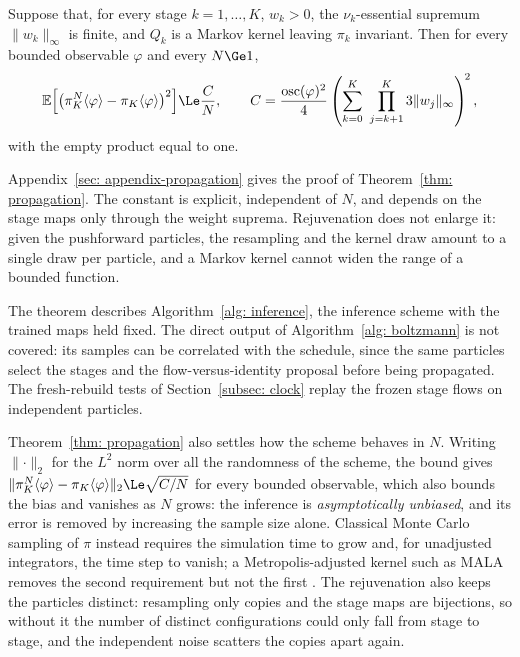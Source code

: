 \documentclass{article}
\begin{document}
\begin{theorem}
\label{thm: propagation}
Suppose that, for every stage $k=1,\dots,K$, $w_k>0$, the $\nu_k$-essential supremum $\lVert w_k \rVert_\infty$ is finite, and $Q_k$ is a Markov kernel leaving $\pi_k$ invariant. Then for every bounded observable $\varphi$ and every $N \Ge 1$,
\begin{equation}
    \mathbb E\Bigl[\bigl(\pi_K^N\langle \varphi\rangle - \pi_K\langle \varphi\rangle\bigr)^{2}\Bigr]
    \Le \frac{C}{N},
    \qquad
    C = \frac{\operatorname{osc}(\varphi)^{2}}{4}
    \left(\sum_{k=0}^{K}\ \prod_{j=k+1}^{K} 3\lVert w_j \rVert_\infty\right)^{\!2},
    \label{eq: propagation-bound}
\end{equation}
with the empty product equal to one.
\end{theorem}
\noindent
Appendix~\ref{sec: appendix-propagation} gives the proof of Theorem~\ref{thm: propagation}. The constant is explicit, independent of $N$, and depends on the stage maps only through the weight suprema. Rejuvenation does not enlarge it: given the pushforward particles, the resampling and the kernel draw amount to a single draw per particle, and a Markov kernel cannot widen the range of a bounded function.

\begin{remark}
The theorem describes Algorithm~\ref{alg: inference}, the inference scheme with the trained maps held fixed. The direct output of Algorithm~\ref{alg: boltzmann} is not covered: its samples can be correlated with the schedule, since the same particles select the stages and the flow-versus-identity proposal before being propagated. The fresh-rebuild tests of Section~\ref{subsec: clock} replay the frozen stage flows on independent particles.
\end{remark}

Theorem~\ref{thm: propagation} also settles how the scheme behaves in $N$. Writing $\lVert\cdot\rVert_2$ for the $L^2$ norm over all the randomness of the scheme, the bound gives $\lVert \pi_K^N\langle \varphi\rangle - \pi_K\langle \varphi\rangle \rVert_2 \Le \sqrt{C/N}$ for every bounded observable, which also bounds the bias and vanishes as $N$ grows: the inference is \emph{asymptotically unbiased}, and its error is removed by increasing the sample size alone. Classical Monte Carlo sampling of $\pi$ instead requires the simulation time to grow and, for unadjusted integrators, the time step to vanish; a Metropolis-adjusted kernel such as MALA removes the second requirement but not the first \citep{metropolis1953equation,hastings1970monte,roberts1996exponential,delmoral2004feynman}. The rejuvenation also keeps the particles distinct: resampling only copies and the stage maps are bijections, so without it the number of distinct configurations could only fall from stage to stage, and the independent noise scatters the copies apart again.
\end{document}
